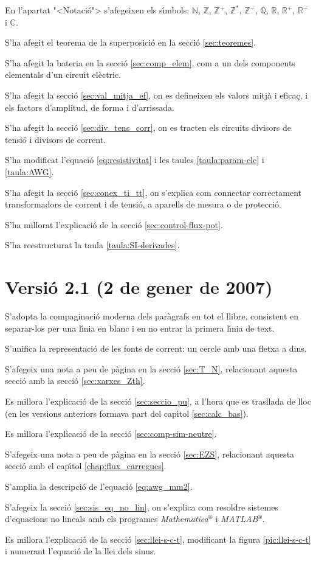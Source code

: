 En l'apartat {"<}Notaci\'{o}{">} s'afegeixen els s\'{\i}mbols: $\mathbb{N}$,
$\mathbb{Z}$, $\mathbb{Z}^+$,  $\mathbb{Z}^*$, $\mathbb{Z}^-$,
$\mathbb{Q}$, $\mathbb{R}$, $\mathbb{R}^+$, $\mathbb{R}^-$ i
$\mathbb{C}$.

S'ha afegit el teorema de la superposici\'{o} en la secci\'{o}
\ref{sec:teoremes}.


S'ha afegit la bateria en la secci\'{o} \ref{sec:comp_elem}, com a un
dels components elementals d'un circuit el\`{e}ctric.

S'ha afegit la secci\'{o} \ref{sec:val_mitja_ef}, on es defineixen els
valors mitj\`{a} i efica\c{c}, i els factors d'amplitud, de forma i
d'arrissada.

S'ha afegit la secci\'{o} \ref{sec:div_tens_corr}, on es tracten els
circuits divisors de tensi\'{o} i divisors de corrent.

 S'ha modificat l'equaci\'{o} \eqref{eq:resistivitat}
i les taules \ref{taula:param-elc} i \ref{taula:AWG}.

S'ha afegit la secci\'{o} \ref{sec:conex_ti_tt}, on s'explica com
connectar correctament transformadors de corrent i de tensi\'{o}, a
aparells de mesura o de protecci\'{o}.

S'ha millorat l'explicaci\'{o} de la secci\'{o} \ref{sec:control-flux-pot}.

S'ha reestructurat la taula \ref{taula:SI-derivades}.

\section*{Versi\'{o} 2.1 (2 de gener de 2007)}

S'adopta la compaginaci\'{o} moderna dels par\`{a}grafs en tot el llibre, consistent en separar-los per una l\'{\i}nia en blanc i en no entrar la primera l\'{\i}nia de text.

S'unifica la representaci\'{o} de les fonts de corrent: un cercle amb una fletxa a dins.

S'afegeix una nota a peu de p\`{a}gina en la secci\'{o} \ref{sec:T_N}, relacionant aquesta secci\'{o} amb la secci\'{o} \ref{sec:xarxes_Zth}.

Es millora l'explicaci\'{o} de la secci\'{o} \ref{sec:seccio_pu}, a l'hora que es trasllada de lloc (en les versions anteriors formava part del cap\'{\i}tol \ref{sec:calc_bas}).

Es millora l'explicaci\'{o} de la secci\'{o} \ref{sec:comp-sim-neutre}.

S'afegeix una nota a peu de p\`{a}gina en la secci\'{o} \ref{sec:EZS}, relacionant aquesta secci\'{o} amb el cap\'{\i}tol \ref{chap:flux_carregues}.

S'amplia la descripci\'{o} de l'equaci\'{o} \eqref{eq:awg_mm2}.

S'afegeix la secci\'{o} \ref{sec:sis_eq_no_lin}, on s'explica com resoldre sistemes d'equacions no lineals amb els programes \textit{Mathematica}${}^\circledR$ i \textit{MATLAB}${}^\circledR$.

Es millora l'explicaci\'{o} de la secci\'{o} \ref{sec:llei-s-c-t}, modificant la figura \ref{pic:llei-s-c-t} i numerant l'equaci\'{o} de la llei dels sinus. 